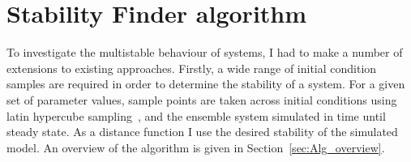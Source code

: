 % 
%
%
\section{Stability Finder algorithm}

To investigate the multistable behaviour of systems, I had to make a number of extensions to existing approaches. Firstly, a wide range of initial condition samples are required in order to determine the stability of a system. For a given set of parameter values, sample points are taken across initial conditions using latin hypercube sampling~\autocite{MCKAY:2000vt}, and the ensemble system simulated in time until steady state. As a distance function I use the desired stability of the simulated model. An overview of the algorithm is given in Section~\ref{sec:Alg_overview}. %


